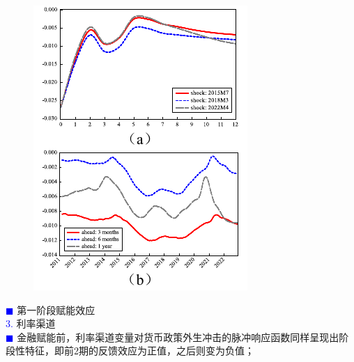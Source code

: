 \documentclass[12pt,aspectratio=169]{ctexbeamer}
\begin{document}
				\begin{frame}
				\frametitle{}
				\begin{figure}
					\centering
					\vspace{3mm}
					\includegraphics[height=0.7\textheight]{figures/fig.5-7}
				\end{figure}
				\vspace{-3mm}
				\textcolor{blue}{\footnotesize $\blacksquare$} \large 第一阶段赋能效应\\
				\hspace{1em}
				\textcolor{blue}{\footnotesize 3.} {\normalsize 利率渠道}\\
				\justifying
				\footnotesize
				\hspace{2em}
				\textcolor{blue}{\tiny $\blacksquare$} 金融赋能前，利率渠道变量对货币政策外生冲击的脉冲响应函数同样呈现出阶段性特征，即前2期的反馈效应为正值，之后则变为负值；\\
				\hspace{2em}

\end{frame}
\end{document}
